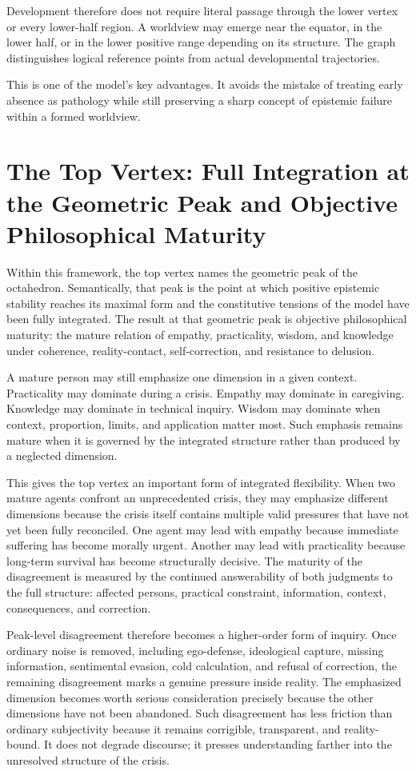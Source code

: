 \documentclass[11pt]{article}
\begin{document}
Development therefore does not require literal passage through the lower vertex or every lower-half region. A worldview may emerge near the equator, in the lower half, or in the lower positive range depending on its structure. The graph distinguishes logical reference points from actual developmental trajectories.

This is one of the model's key advantages. It avoids the mistake of treating early absence as pathology while still preserving a sharp concept of epistemic failure within a formed worldview.

\section{The Top Vertex: Full Integration at the Geometric Peak and Objective Philosophical Maturity}

Within this framework, the top vertex names the geometric peak of the octahedron. Semantically, that peak is the point at which positive epistemic stability reaches its maximal form and the constitutive tensions of the model have been fully integrated. The result at that geometric peak is objective philosophical maturity: the mature relation of empathy, practicality, wisdom, and knowledge under coherence, reality-contact, self-correction, and resistance to delusion.

A mature person may still emphasize one dimension in a given context. Practicality may dominate during a crisis. Empathy may dominate in caregiving. Knowledge may dominate in technical inquiry. Wisdom may dominate when context, proportion, limits, and application matter most. Such emphasis remains mature when it is governed by the integrated structure rather than produced by a neglected dimension.

This gives the top vertex an important form of integrated flexibility. When two mature agents confront an unprecedented crisis, they may emphasize different dimensions because the crisis itself contains multiple valid pressures that have not yet been fully reconciled. One agent may lead with empathy because immediate suffering has become morally urgent. Another may lead with practicality because long-term survival has become structurally decisive. The maturity of the disagreement is measured by the continued answerability of both judgments to the full structure: affected persons, practical constraint, information, context, consequences, and correction.

Peak-level disagreement therefore becomes a higher-order form of inquiry. Once ordinary noise is removed, including ego-defense, ideological capture, missing information, sentimental evasion, cold calculation, and refusal of correction, the remaining disagreement marks a genuine pressure inside reality. The emphasized dimension becomes worth serious consideration precisely because the other dimensions have not been abandoned. Such disagreement has less friction than ordinary subjectivity because it remains corrigible, transparent, and reality-bound. It does not degrade discourse; it presses understanding farther into the unresolved structure of the crisis.
\end{document}
